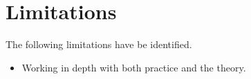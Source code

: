
\section{Limitations}

The following limitations have be identified.

\begin{itemize}
    \item Working in depth  with  both practice and the theory.

\end{itemize}


